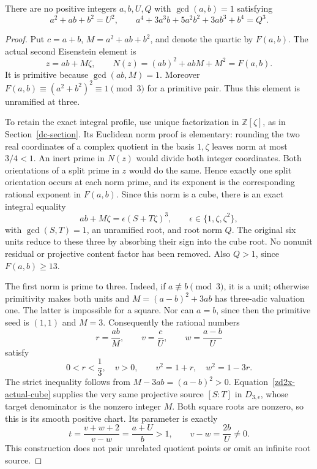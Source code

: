 \begin{theorem}
\label{zd2x-actual-exclusion}
There are no positive integers \(a,b,U,Q\) with
\(\gcd(a,b)=1\) satisfying
\begin{equation}
 a^2+ab+b^2=U^2,\qquad
 a^4+3a^3b+5a^2b^2+3ab^3+b^4=Q^3.
 \label{zd2x-actual-system}
\end{equation}
\end{theorem}
\begin{proof}
Put \(c=a+b\), \(M=a^2+ab+b^2\), and denote the quartic
by \(F(a,b)\). The actual second Eisenstein element is
\[
 z=ab+M\zeta,\qquad N(z)=(ab)^2+abM+M^2=F(a,b).
\]
It is primitive because \(\gcd(ab,M)=1\). Moreover
\(F(a,b)\equiv(a^2+b^2)^2\equiv1\pmod3\) for a
primitive pair. Thus this element is unramified at three.

To retain the exact integral profile, use unique
factorization in \(\mathbb Z[\zeta]\), as in
Section~\ref{dc-section}. Its Euclidean norm proof is
elementary: rounding the two real coordinates of a
complex quotient in the basis \(1,\zeta\) leaves norm
at most \(3/4<1\). An inert prime in \(N(z)\) would
divide both integer coordinates. Both orientations
of a split prime in \(z\) would do the same. Hence
exactly one split orientation occurs at each norm
prime, and its exponent is the corresponding
rational exponent in \(F(a,b)\). Since this norm is
a cube, there is an exact integral equality
\begin{equation}
 ab+M\zeta=\epsilon(S+T\zeta)^3,\qquad
 \epsilon\in\{1,\zeta,\zeta^2\},
 \label{zd2x-actual-cube}
\end{equation}
with \(\gcd(S,T)=1\), an unramified root, and root
norm \(Q\). The original six units reduce to these
three by absorbing their sign into the cube root.
No nonunit residual or projective content factor has
been removed. Also \(Q>1\), since \(F(a,b)\ge13\).

The first norm is prime to three. Indeed, if
\(a\not\equiv b\pmod3\), it is a unit; otherwise
primitivity makes both units and
\(M=(a-b)^2+3ab\) has three-adic valuation one.
The latter is impossible for a square. Nor can
\(a=b\), since then the primitive seed is \((1,1)\)
and \(M=3\).
Consequently the rational numbers
\[
 r=\frac{ab}{M},\qquad v=\frac cU,\qquad
 w=\frac{a-b}{U}
\]
satisfy
\[
 0<r<\frac13,\quad v>0,\qquad
 v^2=1+r,\quad w^2=1-3r .
\]
The strict inequality follows from
\(M-3ab=(a-b)^2>0\).
Equation~\eqref{zd2x-actual-cube} supplies the very
same projective source \([S:T]\) in
\(D_{3,\epsilon}\), whose target denominator is
the nonzero integer \(M\). Both square roots are
nonzero, so this is its smooth positive chart.
Its parameter is exactly
\[
 t=\frac{v+w+2}{v-w}=\frac{a+U}{b}>1,
 \qquad v-w=\frac{2b}{U}\ne0 .
\]
This construction does not pair unrelated quotient
points or omit an infinite root source.


\end{proof}
